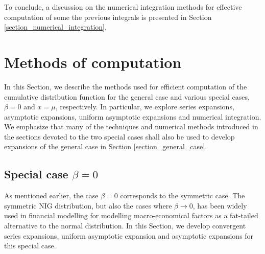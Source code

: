 \documentclass[10pt,a4paper,oneside]{article}
\numberwithin{equation}{section}
\begin{document}
To conclude, a discussion on the numerical integration methods for effective computation of some the previous integrals is presented in Section \ref{section_numerical_integration}.

%
%

\section{Methods of computation}\label{section_methods_of_computation}
In this Section, we describe the methods used for efficient computation of the cumulative distribution function for the general case and various special cases, $\beta = 0$ and $x=\mu$, respectively. In particular, we explore series expansions, asymptotic expansions, uniform asymptotic expansions and numerical integration. We emphasize that many of the techniques and numerical methods introduced in the sections devoted to the two special cases shall also be used to develop expansions of the general case in Section \ref{section_general_case}.


\subsection{Special case $\beta = 0$}\label{section_special_case_beta_0}
As mentioned earlier, the case $\beta = 0$ corresponds to the symmetric case. The symmetric NIG distribution, but also the cases where $\beta \to 0$, has been widely used in financial modelling for modelling macro-economical factors as a fat-tailed alternative to the normal distribution. In this Section, we develop convergent series expansions, uniform asymptotic expansion and asymptotic expansions for this special case.
\end{document}
